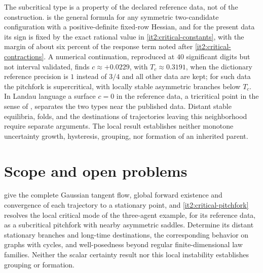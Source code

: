 The subcritical type is a property of the declared reference data, not of the construction.  is the general formula for any symmetric two-candidate configuration with a positive-definite fixed-row Hessian, and for the present data its sign is fixed by the exact rational value in \cref{it2:critical-constants}, with the margin of about six percent of the response term noted after \cref{it2:critical-contractions}. A numerical continuation, reproduced at $40$ significant digits but not interval validated, finds $c\approx+0.0229$, with $T_c\approx0.3191$, when the dictionary reference precision is $1$ instead of $3/4$ and all other data are kept; for such data the pitchfork is supercritical, with locally stable asymmetric branches below $T_c$. In Landau language a surface $c=0$ in the reference data, a tricritical point in the sense of \citet{Griffiths1970}, separates the two types near the published data. Distant stable equilibria, folds, and the destinations of trajectories leaving this neighborhood require separate arguments. The local result establishes neither monotone uncertainty growth, hysteresis, grouping, nor formation of an inherited parent.

\section{Scope and open problems}
\label{it2:ch-next}

 give the complete Gaussian tangent flow, global forward existence and convergence of each trajectory to a stationary point, and \cref{it2:critical-pitchfork} resolves the local critical mode of the three-agent example, for its reference data, as a subcritical pitchfork with nearby asymmetric saddles. Determine its distant stationary branches and long-time destinations, the corresponding behavior on graphs with cycles, and well-posedness beyond regular finite-dimensional law families. Neither the scalar certainty result nor this local instability establishes grouping or formation.

